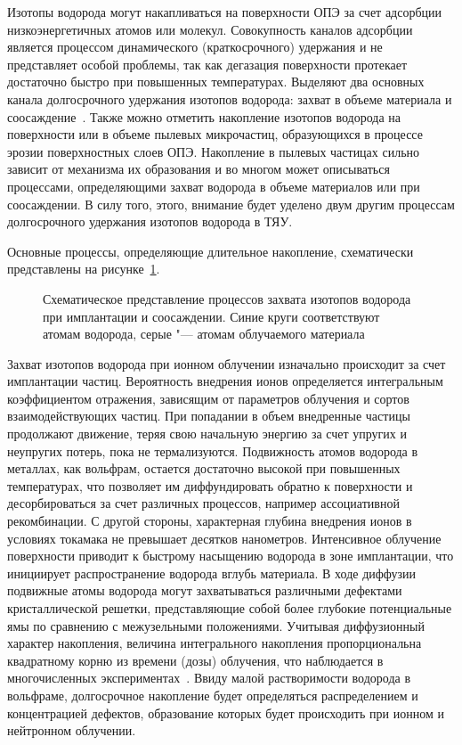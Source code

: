Изотопы водорода могут накапливаться на поверхности ОПЭ за счет адсорбции низкоэнергетичных атомов или молекул. Совокупность каналов адсорбции является процессом динамического (краткосрочного) удержания и не представляет особой проблемы, так как дегазация поверхности протекает достаточно быстро при повышенных температурах. Выделяют два основных канала долгосрочного удержания изотопов водорода: захват в объеме материала и соосаждение~\cite{Gasparyan2024, Skinner2009}. Также можно отметить накопление изотопов водорода на поверхности или в объеме пылевых микрочастиц, образующихся в процессе эрозии поверхностных слоев ОПЭ. Накопление в пылевых частицах сильно зависит от механизма их образования и во многом может описываться процессами, определяющими захват водорода в объеме материалов или при соосаждении.  В силу того, этого, внимание будет уделено двум другим процессам долгосрочного удержания изотопов водорода в ТЯУ.

Основные процессы, определяющие длительное накопление, схематически представлены на рисунке~\cref{fig:ch1/retention_mechanisms}.
\begin{figure}[ht]
    \caption{Схематическое представление процессов захвата изотопов водорода при имплантации и соосаждении. Синие круги соответствуют атомам водорода, серые "--- атомам облучаемого материала}\label{fig:ch1/retention_mechanisms}
\end{figure}
Захват изотопов водорода при ионном облучении изначально происходит за счет имплантации частиц. Вероятность внедрения ионов определяется интегральным коэффициентом отражения, зависящим от параметров облучения и сортов взаимодействующих частиц. При попадании в объем внедренные частицы продолжают движение, теряя свою начальную энергию за счет упругих и неупругих потерь, пока не термализуются. Подвижность атомов водорода в металлах, как вольфрам, остается достаточно высокой при повышенных температурах, что позволяет им диффундировать обратно к поверхности и десорбироваться за счет различных процессов, например ассоциативной рекомбинации. С другой стороны, характерная глубина внедрения ионов в условиях токамака не превышает десятков нанометров. Интенсивное облучение поверхности приводит к быстрому насыщению водорода в зоне имплантации, что инициирует распространение водорода вглубь материала. В ходе диффузии подвижные атомы водорода могут захватываться различными дефектами кристаллической решетки, представляющие собой более глубокие потенциальные ямы по сравнению с межузельными положениями. Учитывая диффузионный характер накопления, величина интегрального накопления пропорциональна квадратному корню из времени (дозы) облучения, что наблюдается в многочисленных экспериментах~\cite{Ogorodnikova2003,Ogorodnikova2009,Sugiyama2014,Zhang2020}. Ввиду малой растворимости водорода в вольфраме, долгосрочное накопление будет определяться распределением и концентрацией дефектов, образование которых будет происходить при ионном и нейтронном облучении.

